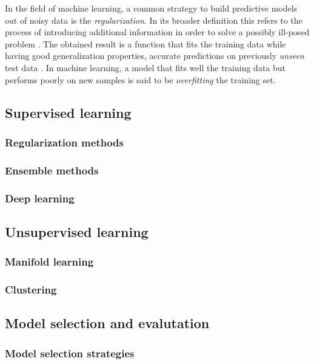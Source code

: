 In the field of machine learning, a common strategy to build predictive models out of noisy data is the \textit{regularization}.
In its broader definition this refers to the process of introducing additional information in order to solve a possibly ill-posed
problem \cite{tikhonov1963solution, evgeniou2000regularization}. The obtained result is a function that fits the training data while having good generalization properties, \ie accurate predictions on previously  \textit{unseen} test data \cite{hastie2009elements}. In machine learning, a model that fits well the training data but performs poorly on new samples is said to be \textit{overfitting} the training set.

  \subsection{Supervised learning} \label{subsec:supervised_learning}
    \subsubsection{Regularization methods}
    \subsubsection{Ensemble methods}
    \subsubsection{Deep learning}


  \subsection{Unsupervised learning} \label{subsec:unsupervised_learning}
    \subsubsection{Manifold learning}
    \subsubsection{Clustering}


  \subsection{Model selection and evalutation} \label{subsec:model_selection}
    \subsubsection{Model selection strategies}
